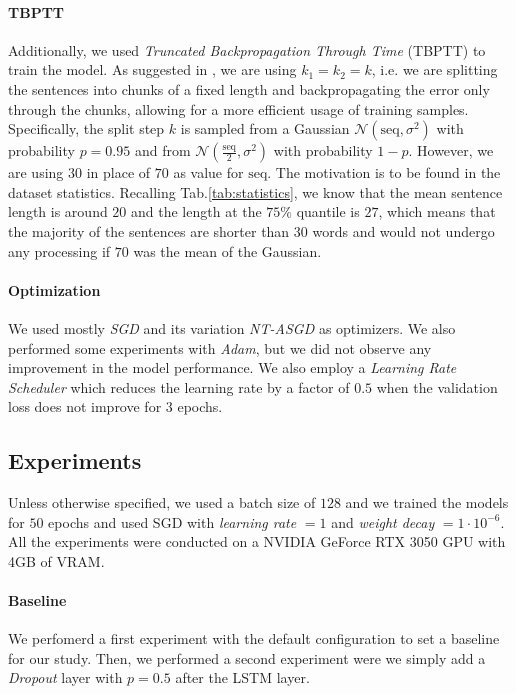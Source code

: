 \paragraph*{TBPTT}
Additionally, we used \emph{Truncated Backpropagation Through Time} (TBPTT) to train the model. As suggested in \cite{merity2017regularizing}, we are using $k_1 = k_2 = k$, i.e. we are splitting the sentences into chunks of a fixed length and backpropagating the error only through the chunks, allowing for a more efficient usage of training samples. Specifically, the split step $k$ is sampled from a Gaussian $\mathcal{N}(\textrm{seq}, \sigma^2)$ with probability $p=0.95$ and from $\mathcal{N}(\frac{\textrm{seq}}{2}, \sigma^2)$ with probability $1-p$. However, we are using $30$ in place of $70$ as value for $\textrm{seq}$. The motivation is to be found in the dataset statistics. Recalling Tab.\ref{tab:statistics}, we know that the mean sentence length is around $20$ and the length at the $75\%$ quantile is $27$, which means that the majority of the sentences are shorter than $30$ words and would not undergo any processing if $70$ was the mean of the Gaussian.

\paragraph*{Optimization}
We used mostly \emph{SGD} and its variation \emph{NT-ASGD}\cite{merity2017regularizing} as optimizers. We also performed some experiments with \emph{Adam}, but we did not observe any improvement in the model performance. We also employ a \emph{Learning Rate Scheduler} which reduces the learning rate by a factor of $0.5$ when the validation loss does not improve for $3$ epochs.

\subsection{Experiments}
Unless otherwise specified, we used a batch size of $128$ and we trained the models for $50$ epochs and used SGD with \emph{learning rate} $= 1$ and \emph{weight decay} $=1\cdot 10^{-6}$. All the experiments were conducted on a NVIDIA GeForce RTX 3050 GPU with 4GB of VRAM.
\paragraph*{Baseline} 
We perfomerd a first experiment with the default configuration to set a baseline for our study. Then, %
we performed a second experiment were we simply add a \emph{Dropout} layer with $p=0.5$ after the LSTM layer.%
